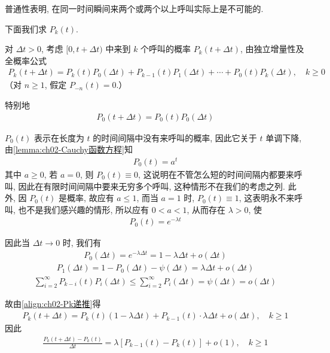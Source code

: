 \documentclass[../../main.tex]{subfiles}
\begin{document}
普通性表明, 在同一时间瞬间来两个或两个以上呼叫实际上是不可能的.

下面我们求 $P_k(t)$.

对 $\Delta t>0$, 考虑 $[0,t+\Delta t)$ 中来到 $k$ 个呼叫的概率 $P_k(t+\Delta t)$, 由独立增量性及全概率公式
\begin{align}
P_k(t+\Delta t)=P_k(t)P_0(\Delta t)+P_{k-1}(t)P_1(\Delta t)+\cdots+P_0(t)P_k(\Delta t),\quad k\geqslant 0\label{align:ch02-Pk递推}
\end{align}
（对 $n\geqslant 1$, 假定 $P_{-n}(t)=0$.）

特别地
\begin{align}
P_0(t+\Delta t)=P_0(t)P_0(\Delta t)\label{align:ch02-P0递推}
\end{align}

$P_0(t)$ 表示在长度为 $t$ 的时间间隔中没有来呼叫的概率, 因此它关于 $t$ 单调下降, 由\cref{lemma:ch02-Cauchy函数方程}知
\begin{align*}
P_0(t)=a^t
\end{align*}
其中 $a\geqslant 0$, 若 $a=0$, 则 $P_0(t)\equiv 0$, 这说明在不管怎么短的时间间隔内都要来呼叫, 因此在有限时间间隔中要来无穷多个呼叫, 这种情形不在我们的考虑之列. 此外, 因 $P_0(t)$ 是概率, 故应有 $a\leqslant 1$, 而当 $a=1$ 时, $P_0(t)\equiv 1$, 这表明永不来呼叫, 也不是我们感兴趣的情形, 所以应有 $0<a<1$, 从而存在 $\lambda>0$, 使
\begin{align}
P_0(t)=e^{-\lambda t}\label{align:ch02-P0指数}
\end{align}

因此当 $\Delta t\to 0$ 时, 我们有
\begin{align*}
P_0(\Delta t)=e^{-\lambda\Delta t}=1-\lambda\Delta t+o(\Delta t)
\end{align*}
\begin{align*}
P_1(\Delta t)=1-P_0(\Delta t)-\psi(\Delta t)=\lambda\Delta t+o(\Delta t)
\end{align*}
\begin{align*}
\sum_{i=2}^{\infty}P_{k-i}(t)P_i(\Delta t)\leqslant \sum_{i=2}^{\infty}P_i(\Delta t)=\psi(\Delta t)=o(\Delta t)
\end{align*}

故由\cref{align:ch02-Pk递推}得
\begin{align*}
P_k(t+\Delta t)=P_k(t)(1-\lambda\Delta t)+P_{k-1}(t)\cdot\lambda\Delta t+o(\Delta t),\quad k\geqslant 1
\end{align*}
因此
\begin{align*}
\frac{P_k(t+\Delta t)-P_k(t)}{\Delta t}=\lambda\left[P_{k-1}(t)-P_k(t)\right]+o(1),\quad k\geqslant 1
\end{align*}
\end{document}
